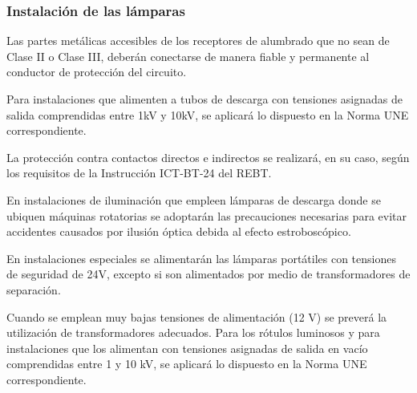\documentclass[../main.tex]{subfiles}
\begin{document}
\subsubsection{Instalación de las lámparas}
Las partes metálicas accesibles de los receptores de alumbrado que no sean de Clase II o Clase III, deberán conectarse de manera fiable y permanente al conductor de protección del circuito. \par
\vspace{0.5 cm}
Para instalaciones que alimenten a tubos de descarga con tensiones asignadas de salida comprendidas entre 1kV y 10kV, se aplicará lo dispuesto en la Norma UNE correspondiente. \par
\vspace{0.5 cm}
La protección contra contactos directos e indirectos se realizará, en su caso, según los requisitos de la Instrucción ICT-BT-24 del REBT. \par
\vspace{0.5 cm}
En instalaciones de iluminación que empleen lámparas de descarga donde se ubiquen máquinas rotatorias se adoptarán las precauciones necesarias para evitar accidentes causados por ilusión óptica debida al efecto estroboscópico. \par
\vspace{0.5 cm}
En instalaciones especiales se alimentarán las lámparas portátiles con tensiones de seguridad de 24V, excepto si son
alimentados por medio de transformadores de separación. \par
\vspace{0.5 cm}
Cuando se emplean muy bajas tensiones de alimentación (12 V) se preverá la utilización de transformadores adecuados.
Para los rótulos luminosos y para instalaciones que los alimentan con tensiones asignadas de salida en vacío
comprendidas entre 1 y 10 kV, se aplicará lo dispuesto en la Norma UNE correspondiente.
\end{document}
